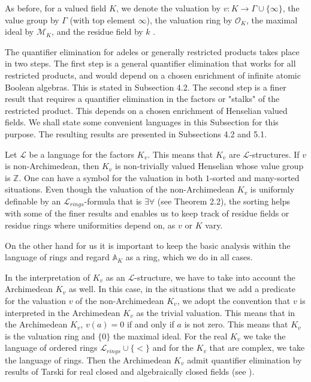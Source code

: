 \documentclass[12pt]{amsart}
\def\A{\mathbb{A}}
\def\Z{\mathbb{Z}}
\def\cL{\mathcal{L}}
\def\cL{\mathcal{L}}
\def\cM{\mathcal M}
\def\cO{\mathcal{O}}
\numberwithin{equation}{section}
\begin{document}
\medskip

As before, for a valued field $K$, we denote the valuation by $v: K\rightarrow \Gamma \cup \{\infty\}$,  the value group by $\Gamma$ (with top element $\infty$), the valuation ring by $\cO_K$, 
 the maximal ideal by $\cM_K$, and the residue field by $k$ . 

The quantifier elimination for adeles or generally restricted products takes place in two steps. The first step is a general quantifier elimination that works for all restricted products, and would depend on a chosen enrichment of infinite atomic Boolean algebras. This is stated in Subsection 4.2. The second step is a finer result that requires a quantifier elimination in the factors or "stalks" of the restricted product. This depends on a chosen enrichment of Henselian valued fields. We shall state some convenient languages in this Subsection for this purpose. The resulting results are presented in Subsections 4.2 and 5.1.

Let $\cL$ be a language for the factors $K_v$. This means that $K_v$ are $\cL$-structures. If $v$ is non-Archimedean, then 
$K_v$ is non-trivially valued Henselian whose value group is $\Z$. One can have a symbol for the valuation in both $1$-sorted and many-sorted  situations. Even though the valuation of the non-Archimedean $K_v$ is uniformly definable by an $\cL_{rings}$-formula that is $\exists \forall$ (see Theorem 2.2), the sorting helps with some of the finer results and enables us to keep track of residue fields or residue rings where uniformities depend on, as $v$ or $K$ vary.

On the other hand for us it is important to keep the basic analysis within the language of rings and regard $\A_K$ as a ring, which we do in all cases.

In the interpretation of $K_v$ as an $\cL$-structure, we have to take into account the Archimedean $K_v$ as well. In this case, in the situations that we add a predicate for the valuation $v$ of the non-Archimedean $K_v$, we adopt the convention that $v$ is interpreted in the Archimedean $K_v$ as the trivial valuation. This means that in the Archimedean $K_v$, 
$v(a)=0$ if and only if $a$ is not zero. This means that $K_v$ is the valuation ring and $\{0\}$ the maximal ideal. For the real $K_v$ we take the language of ordered rings $\cL_{rings} \cup \{<\}$ and for the $K_v$ that are complex, we take the language of rings. Then the  Archimedean $K_v$ admit quantifier elimination by results of Tarski for real closed and algebraically closed fields (see \cite{KK}).
\end{document}
